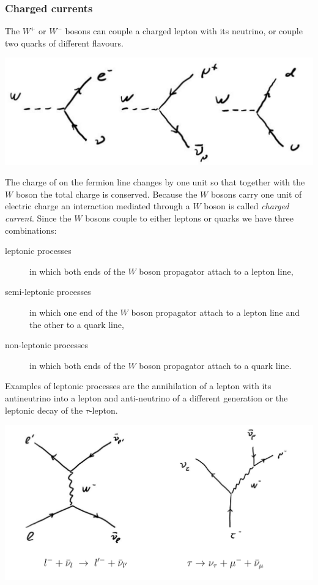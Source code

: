 \documentclass[12pt]{article}
\begin{document}
\subsubsection{Charged currents}
%
%
The $W^+$ or $W^-$ bosons can couple a charged lepton with its neutrino, or couple two quarks of different flavours.  
\begin{center}
\includegraphics[scale=0.4]{images/Wvertices.png}
\end{center}    
The charge of on the fermion line changes by one unit so that together with the $W$ boson the total charge is conserved. Because the $W$ bosons carry one unit of electric charge an interaction mediated through a $W$ boson is called \emph{charged current}. Since the $W$ bosons couple to either leptons or quarks we have three combinations: 
\begin{description}
\item[leptonic processes] in which both ends of the $W$ boson propagator attach to a lepton line,
\item[semi-leptonic processes] in which one end of the $W$ boson propagator attach to a lepton line and the other to a quark line,
\item[non-leptonic processes] in which both ends of the $W$ boson propagator attach to a quark line.
\end{description} 
Examples of leptonic processes are the annihilation of a lepton with its antineutrino into a lepton and anti-neutrino of a different generation or the leptonic decay of the $\tau$-lepton.  
\begin{center}
\includegraphics[scale=0.2]{images/WeakLeptonic.png}
\end{center}
\end{document}
